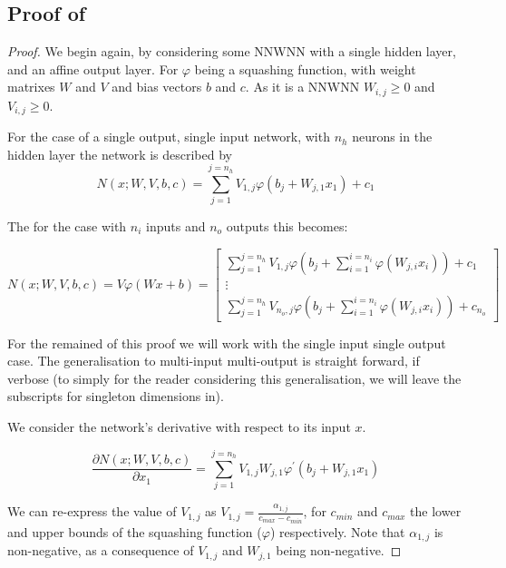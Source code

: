 \documentclass{article} %
\begin{document}
\subsection{Proof of }
\begin{proof}


We begin again, by considering some NNWNN with a single hidden layer, and an affine output layer.
For $\varphi$ being a squashing function, with weight matrixes $W$ and $V$ and bias vectors $b$ and $c$.
As it is a NNWNN $W_{i,j} \ge 0$ and $V_{i,j} \ge 0$.

For the case of a single output, single input network, with $n_h$ neurons in the hidden layer the network is described by
\begin{equation}
N(x;W,V,b,c) = \sum_{j=1}^{j=n_h} V_{1,j} \varphi (b_j+W_{j,1}x_1) + c_1
\end{equation}

The for the case with $n_i$ inputs and $n_o$ outputs this becomes:

\begin{equation}
N(x;W,V,b,c)=V\varphi(Wx+b)=\left[\begin{array}{c}
{\displaystyle \sum_{j=1}^{j=n_{h}}}V_{1,j}\varphi\left(b_{j}+\sum_{i=1}^{i=n_{i}}\varphi\left(W_{j,i}x_{i}\right)\right) + c_1\\
\vdots\\
{\displaystyle \sum_{j=1}^{j=n_{h}}}V_{n_{o},j}\varphi\left(b_{j}+\sum_{i=1}^{i=n_{i}}\varphi\left(W_{j,i}x_{i}\right)\right) +c_{n_o}
\end{array}\right]
\end{equation}

For the remained of this proof we will work with the single input single output case.
The generalisation to multi-input multi-output is straight forward, if verbose (to simply for the reader considering this generalisation, we will leave the subscripts for singleton dimensions in).

We consider the network's derivative with respect to its input $x$.

\begin{equation}
\frac{\partial N(x;W,V,b,c)}{\partial x_1} = \sum_{j=1}^{j=n_h} V_{1,j}W_{j,1} \varphi^\prime (b_j+W_{j,1}x_1)
\end{equation}

We can re-express the value of $V_{1,j}$ as $V_{1,j}=\frac{\alpha_{1,j}}{c_{max}-c_{min}}$,
for $c_{min}$ and $c_{max}$ the lower and upper bounds of the squashing function ($\varphi$) respectively.
Note that $\alpha_{1,j}$ is non-negative, as a consequence of $V_{1,j}$ and $W_{j,1}$ being non-negative.


\end{proof}
\end{document}
